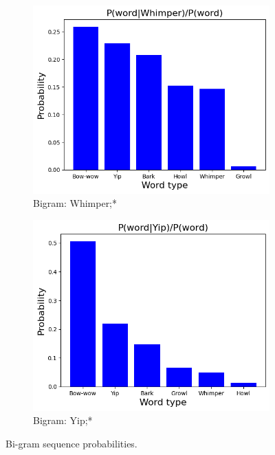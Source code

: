 \begin{figure}[th]
\begin{subfigure}[b]{0.3\textwidth}
    	\includegraphics[width=\textwidth]{images/Whimper.png}
	\caption{Bigram: Whimper;*}
    \end{subfigure}
    \begin{subfigure}[b]{0.3\textwidth}
	\centering
    	\includegraphics[width=\textwidth]{images/Yip.png}
	\caption{Bigram: Yip;*}
    \end{subfigure}
    \caption{Bi-gram sequence probabilities.}
    \label{tab:bigramword}
\end{figure}

